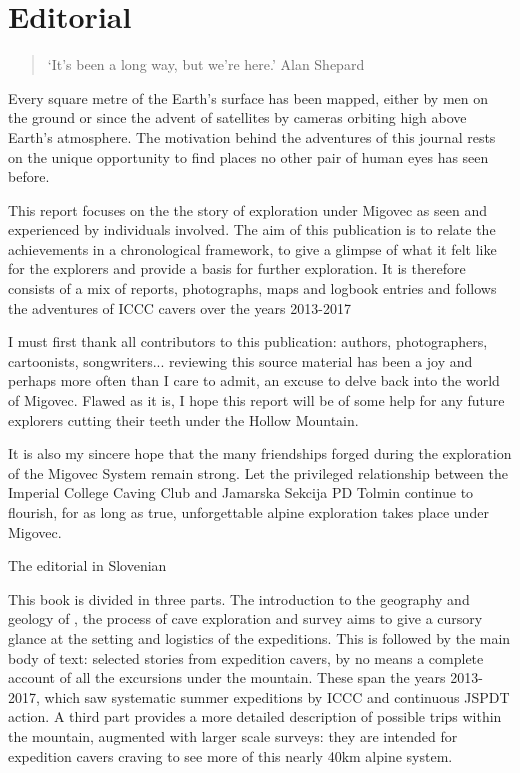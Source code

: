 \chapter*{Editorial}

\begin{quote}
`It's been a long way, but we're here.' Alan Shepard
\end{quote}

Every square metre of the Earth's surface has been mapped, either by men on the ground or since the advent of satellites by cameras orbiting high above Earth's atmosphere. The motivation behind the adventures of this journal rests on the unique opportunity to find places no other pair of human eyes has seen before.

This report focuses on the the story of exploration under Migovec as seen and experienced by individuals involved. The aim of this publication is to relate the achievements in a chronological framework, to give a glimpse of what it felt like for the explorers and provide a basis for further exploration. It is therefore consists of a mix of reports, photographs, maps and logbook entries and follows the adventures of ICCC cavers over the years 2013-2017

I must first thank all contributors to this publication: authors, photographers, cartoonists, songwriters... reviewing this source material has been a joy and perhaps more often than I care to admit, an excuse to delve back into the world of Migovec. Flawed as it is, I hope this report will be of some help for any future explorers cutting their teeth under the Hollow Mountain. 

It is also my sincere hope that the many friendships forged during the exploration of the Migovec System remain strong. Let the privileged relationship between the Imperial College Caving Club and Jamarska Sekcija PD Tolmin continue to flourish, for as long as true, unforgettable alpine exploration takes place under Migovec.



\mydelimiter

The editorial in Slovenian

\mydelimiter

This book is divided in three parts. The introduction to the geography and geology of , the process of cave exploration and survey aims to give a cursory glance at the setting and logistics of the expeditions. This is followed by the main body of text: selected stories from expedition cavers, by no means a complete account of all the excursions under the mountain. These span the years 2013-2017, which saw systematic summer expeditions by ICCC and continuous JSPDT action. A third part provides a more detailed description of possible trips within the mountain, augmented with larger scale surveys: they are intended for expedition cavers craving to see more of this nearly 40km alpine system. 